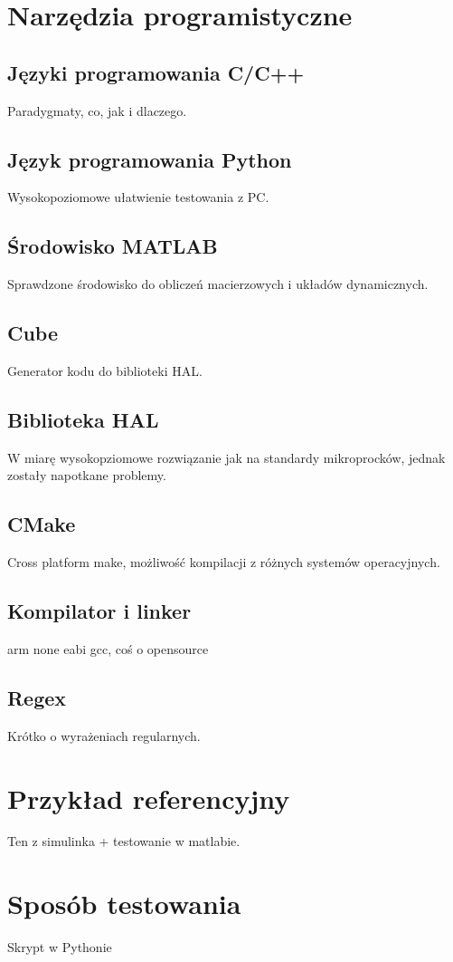 \section{Narzędzia programistyczne} \label{sec:prog}

\subsection{Języki programowania C/C++} \label{sec:cpp}
Paradygmaty, co, jak i dlaczego.

\subsection{Język programowania Python} \label{sec:python}
Wysokopoziomowe ułatwienie testowania z PC.

\subsection{Środowisko MATLAB} \label{sec:matlab}
Sprawdzone środowisko do obliczeń macierzowych i układów dynamicznych.

\subsection{Cube} \label{sec:cube}
Generator kodu do biblioteki HAL.

\subsection{Biblioteka HAL} \label{sec:hal}
W miarę wysokopziomowe rozwiązanie jak na standardy mikroprocków, jednak zostały napotkane problemy.

\subsection{CMake} \label{sec:cmake}
Cross platform make, możliwość kompilacji z różnych systemów operacyjnych.

\subsection{Kompilator i linker} \label{sec:gcc}
arm none eabi gcc, coś o opensource

\subsection{Regex} \label{sec:regex}
Krótko o wyrażeniach regularnych.

\section{Przykład referencyjny} \label{sec:ref}
Ten z simulinka + testowanie w matlabie.

\section{Sposób testowania} \label{sec:tests}
Skrypt w Pythonie
